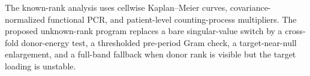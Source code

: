 The known-rank analysis uses cellwise Kaplan--Meier curves, covariance-normalized functional PCR, and patient-level counting-process multipliers.  The proposed unknown-rank program replaces a bare singular-value switch by a cross-fold donor-energy test, a thresholded pre-period Gram check, a target-near-null enlargement, and a full-band fallback when donor rank is visible but the target loading is unstable.